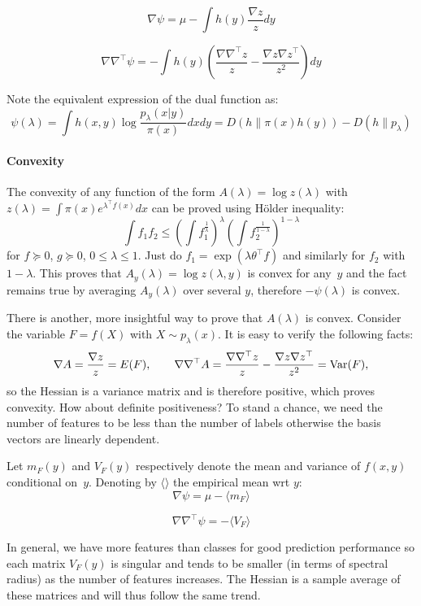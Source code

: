 \documentclass[english]{scrartcl}
\begin{document}
$$
\nabla\psi
= \mu - \int h(y) \frac{\nabla z}{z} dy
$$

$$
\nabla\nabla^\top\psi
= - \int h(y) \left(
\frac{\nabla \nabla^\top z}{z} 
- \frac{\nabla z \nabla z^\top}{z^2}
\right)
dy
$$

Note the equivalent expression of the dual function as:
$$
\psi(\lambda)
=
\int h(x,y) \log \frac{p_\lambda(x|y)}{\pi(x)} dx dy
= D(h\|\pi(x)h(y)) - D(h\|p_\lambda)
$$


\paragraph{Convexity}

The convexity of any function of the form $A(\lambda)=\log z(\lambda)$ with $z(\lambda)=\int\pi(x)e^{\lambda^\top f(x)}dx$ can be proved using H\"older inequality:
$$
\int f_1 f_2 \leq 
\left(\int f_1^{\frac{1}{\lambda}} \right)^\lambda  
\left(\int f_2^{\frac{1}{1-\lambda}} \right)^{1-\lambda}  
$$
for $f\succeq 0$, $g\succeq 0$, $0\leq\lambda\leq 1$. Just do $f_1=\exp(\lambda\theta^\top f)$ and similarly for $f_2$ with $1-\lambda$. This proves that $A_y(\lambda) = \log z(\lambda,y)$ is convex for any~$y$  and the fact remains true by averaging $A_y(\lambda)$ over several $y$, therefore $-\psi(\lambda)$ is convex.

There is another, more insightful way to prove that $A(\lambda)$ is convex. Consider the variable $F=f(X)$ with $X\sim p_\lambda(x)$. It is easy to verify the following facts:
$$
\nabla A = \frac{\nabla z}{z} = E(F),
\qquad
\nabla\nabla^\top A 
= \frac{\nabla\nabla^\top z}{z} 
- \frac{\nabla z \nabla z^\top}{z^2}
= {\rm Var}(F),
$$
so the Hessian is a variance matrix and is therefore positive, which proves convexity. How about definite positiveness? To stand a chance, we need the number of features to be less than the number of labels otherwise the basis vectors are linearly dependent.

Let $m_F(y)$ and $V_F(y)$ respectively denote the mean and variance of $f(x,y)$ conditional on~$y$. Denoting by $\langle \rangle$ the empirical mean wrt $y$:
$$
\nabla \psi = \mu - \langle m_F \rangle
$$

$$
\nabla \nabla^\top \psi = - \langle V_F \rangle
$$

In general, we have more features than classes for good prediction performance so each matrix $V_F(y)$ is singular and tends to be smaller (in terms of spectral radius) as the number of features increases. The Hessian is a sample average of these matrices and will thus follow the same trend.
\end{document}
